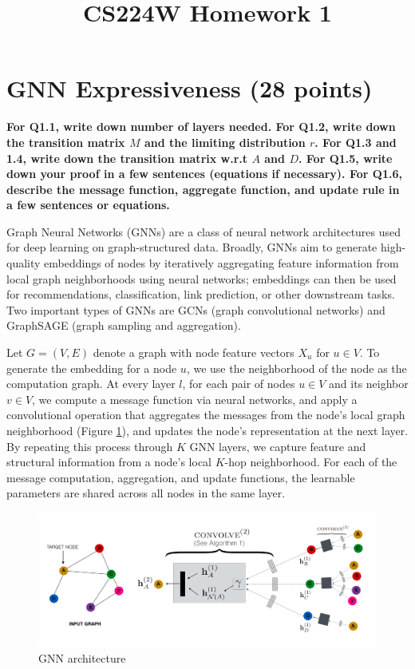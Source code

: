 \documentclass{article}
\title{CS224W Homework 1}
\numberwithin{figure}{section}
\begin{document}
\maketitle


\section{GNN Expressiveness (28 points)}


\textbf{ For Q1.1, write down number of layers needed. For Q1.2, write down the transition matrix $M$ and the limiting distribution $r$. For Q1.3 and 1.4, write down the transition matrix w.r.t $A$ and $D$. For Q1.5, write down your proof in a few sentences (equations if necessary). For Q1.6, describe the message function, aggregate function, and update rule in a few sentences or equations.}

Graph Neural Networks (GNNs) are a class of neural network architectures used for deep learning on graph-structured data. Broadly, GNNs aim to generate high-quality embeddings of nodes by iteratively aggregating feature information from local graph neighborhoods using neural networks; embeddings can then be used for recommendations, classification, link prediction, or other downstream tasks. Two important types of GNNs are GCNs (graph convolutional networks) and GraphSAGE (graph sampling and aggregation).

Let $G = (V,E)$ denote a graph with node feature vectors $X_u$ for $u \in V$. To generate the embedding for a node $u$, we use the neighborhood of the node as the computation graph. At every layer $l$, for each pair of nodes $u \in V$ and its neighbor $v \in V$, we compute a message function via neural networks, and apply a convolutional operation that aggregates the messages from the node’s local graph neighborhood (Figure \ref{fig:Q4-gnn-architecture}), and updates the node’s representation at the next layer. By repeating this process through $K$ GNN layers, we capture feature and structural information from a node’s local $K$-hop neighborhood. For each of the message computation, aggregation, and update functions, the learnable parameters are shared across all nodes in the same layer.

\begin{figure}[!htb]
\centering
  \includegraphics[width=0.7\columnwidth]{CS224W_Homework1/gnn-architecture.png}
  \caption{GNN architecture}   
  \label{fig:Q4-gnn-architecture}
\end{figure}
\end{document}
